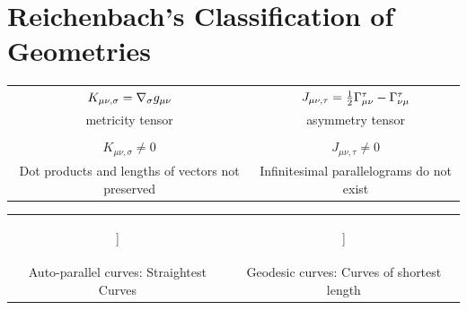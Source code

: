 \documentclass[submitted]{article}
\begin{document}
\appendix
\section{Reichenbach's Classification of Geometries}
\label{appendix}


\footnotesize
\begin{infobox}
\begin{center}
\begin{tabular}{cc}
 $K_{\mu \nu, \sigma} = \nabla_{\sigma} g_{\mu\nu}$ & $J_{\mu\nu,\tau}=\frac{1}{2} \Gamma^\tau_{\mu\nu}-\Gamma^\tau_{\nu\mu}$ \\
metricity tensor & asymmetry tensor \\ \\
 $K_{\mu \nu, \sigma} \neq 0$ & $J_{\mu\nu,\tau} \neq 0$ \\

Dot products and lengths of vectors not preserved & Infinitesimal parallelograms do not exist

 \end{tabular}
 \end{center}
\end{infobox}
\begin{infobox}
\begin{center}
\begin{tabular}{cc}
\begin{forest}
[{$\begin{array}{c}\text{Displacement Space} \\ K_{\mu \nu, \sigma} \neq 0 \end{array}$} [{$\begin{array}{c}\text{Weyl geometry} \\ \Gtmn=\Gtnm \end{array}$}] [{$\Gtmn\neq\Gtnm$}]]
\end{forest} 

&

\begin{forest}
[{$\begin{array}{c}\text{Metrical Space} \\ K_{\mu \nu, \sigma} = 0\end{array}$} [{$\begin{array}{c}\text{Riemann Geometry} \\ \Gtmn=\Gtnm \end{array}$}] [{$\begin{array}{c}\text{Reichenbach Geometry} \\ \Gtmn\neq\Gtnm \end{array}$}\hide{[{$\begin{array}{c}\text{Einstein Geometry} \\ \ritea=0 \end{array}$}]}]]
\end{forest} \\
Auto-parallel curves: Straightest Curves & Geodesic curves: Curves of shortest length 

\end{tabular}
\end{center}
\end{infobox}
\end{document}

